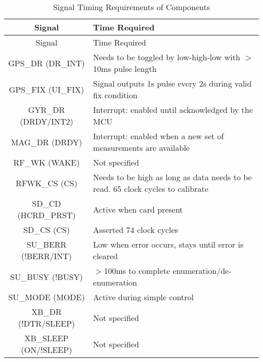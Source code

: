 \begin{center}
    \begin{longtable}{|c|p{3in}|}
    \caption{Signal Timing Requirements of Components  \label{tab:timeReqs}} \\

     \hline
    \rowcolor{Gray}
   Signal  & Time Required \\
    \hline \endfirsthead
    
         \hline
    \rowcolor{Gray}
    Signal  & Time Required \\
    \hline \endhead
    
    \endfoot

    GPS\_DR (DR\_INT) & Needs to be toggled by low-high-low with $>$10ms pulse length \\ \hline
    GPS\_FIX (UI\_FIX) & Signal outputs 1s pulse every 2s during valid fix condition \\ \hline
    GYR\_DR (DRDY/INT2) & Interrupt: enabled until acknowledged by the MCU \\ \hline
    MAG\_DR (DRDY) & Interrupt: enabled when a new set of measurements are available \\ \hline
    RF\_WK (WAKE) & Not specified \\ \hline
    RFWK\_CS (CS) & Needs to be high as long as data needs to be read. 65 clock cycles to calibrate \\ \hline
    SD\_CD (HCRD\_PRST) & Active when card present \\ \hline
    SD\_CS (CS) & Asserted 74 clock cycles \\ \hline
    SU\_BERR (!BERR/INT) & Low when error occurs, stays until error is cleared \\ \hline
    SU\_BUSY (!BUSY) & $>$100ms to complete enumeration/de-enumeration \\ \hline
    SU\_MODE (MODE) & Active during simple control \\ \hline
    XB\_DR (!DTR/SLEEP) & Not specified \\ \hline
    XB\_SLEEP (ON/!SLEEP) & Not specified \\ \hline
    \end{longtable}%

\end{center}%
  \vspace{-2cm}
  

